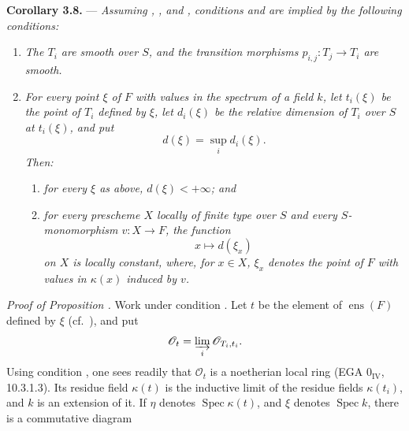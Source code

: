 \medskip
\noindent{}\textbf{Corollary 3.8.} ---
\textit{Assuming , , and , conditions  and  are
implied by the following conditions:}

\begin{enumerate}
\item[\(c'\)] %
\textit{The \(T_i\) are smooth over \(S\), and the transition
morphisms \(p_{i,j}:T_j\to T_i\) are smooth.}

\item[\(d'\)] %
\textit{For every point \(\xi\) of \(F\) with values in the spectrum
of a field \(k\), let \(t_i(\xi)\) be the point of \(T_i\) defined by
\(\xi\), let \(d_i(\xi)\) be the relative dimension of \(T_i\) over
\(S\) at \(t_i(\xi)\), and put
\[
  d(\xi)=\sup_i d_i(\xi).
\]
Then:}
  \begin{enumerate}
  \item[\(1^\circ\)] %
  \textit{for every \(\xi\) as above,
  \(d(\xi)<+\infty\); and}

  \item[\(2^\circ\)] %
  \textit{for every prescheme \(X\) locally of finite type over
  \(S\) and every \(S\)-monomorphism \(v:X\to F\), the function
  \[
    x\longmapsto d(\xi_x)
  \]
  on \(X\) is locally constant, where, for \(x\in X\), \(\xi_x\)
  denotes the point of \(F\) with values in \(\kappa(x)\) induced by
  \(v\).}
  \end{enumerate}
\end{enumerate}

\smallskip
\noindent\emph{Proof of Proposition
.}
Work under condition .  Let \(t\) be the element of
\(\operatorname{ens}(F)\) defined by \(\xi\) (cf.\ ), and put
\[
  \mathscr O_t=\varinjlim_i\mathscr O_{T_i,t_i}.
\]
Using condition , one sees readily that \(\mathscr O_t\) is a
noetherian local ring (EGA \(0_{\mathrm{IV}}\), 10.3.1.3).  Its
residue field \(\kappa(t)\) is the inductive limit of the residue
fields \(\kappa(t_i)\), and \(k\) is an extension of it.  If
\(\eta\) denotes \(\operatorname{Spec}\kappa(t)\), and \(\xi\)
denotes \(\operatorname{Spec}k\), there is a commutative diagram

